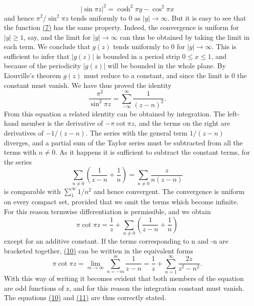 \begin{equation*}
\left| \sin \pi z \right| ^ {2} = \cosh^ {2} \pi y - \cos^ {2} \pi x
\end{equation*}
and hence $\pi^2/\sin^2\pi z$ tends uniformly to 0 as $|y|\to\infty$. But it is easy to see that the function \hyperref[eq:5.7]{(7)} has the same property. Indeed, the convergence is uniform for $|y|\geq1$, say, and the limit for $|y|\to\infty$ can thus be obtained by taking the limit in each term. We conclude that $g(z)$ tends uniformly to 0 for $|y|\to\infty$. This is sufficient to infer that $|g(z)|$ is bounded in a period strip $0\leq x\leq1$, and because of the periodicity $|g(z)|$ will be bounded in the whole plane. By Liouville's theorem $g(z)$ must reduce to a constant, and since the limit is 0 the constant must vanish. We have thus proved the identity
\begin{equation*}
\frac {\pi^ {2}}{\sin^ {2} \pi z} = \sum_ {- \infty} ^ {\infty} \frac {1}{(z - n) ^ {2}}.\tag{9}\label{eq:5.9}
\end{equation*}
From this equation a related identity can be obtained by integration. The left-hand member is the derivative of $-\pi \cot \pi z$, and the terms on the right are derivatives of $-1/(z - n)$. The series with the general term $1/(z - n)$ diverges, and a partial sum of the Taylor series must be subtracted from all the terms with $n \neq 0$. As it happens it is sufficient to subtract the constant terms, for the series
\begin{equation*}
\sum_ {n \neq 0} \left(\frac {1}{z - n} + \frac {1}{n}\right) = \sum_ {n \neq 0} \frac {z}{n (z - n)}
\end{equation*}
is comparable with $\sum_{1}^{\infty}1/n^{2}$ and hence convergent. The convergence is uniform on every compact set, provided that we omit the terms which become infinite. For this reason termwise differentiation is permissible, and we obtain
\begin{equation*}
\pi \cot \pi z = \frac {1}{z} + \sum_ {n \neq 0} \left(\frac {1}{z - n} + \frac {1}{n}\right)\tag{10}\label{eq:5.10}
\end{equation*}
except for an additive constant. If the terms corresponding to n and -n are bracketed together, \hyperref[eq:5.10]{(10)} can be written in the equivalent forms
\begin{equation*}
\pi \cot \pi z = \lim _ {m \rightarrow \infty} \sum_ {n = - m} ^ {m} \frac {1}{z - n} = \frac {1}{z} + \sum_ {n = 1} ^ {\infty} \frac {2 z}{z ^ {2} - n ^ {2}}.\tag{11}\label{eq:5.11}
\end{equation*}
With this way of writing it becomes evident that both members of the equation are odd functions of z, and for this reason the integration constant must vanish. The equations \hyperref[eq:5.10]{(10)} and \hyperref[eq:5.11]{(11)} are thus correctly stated.

